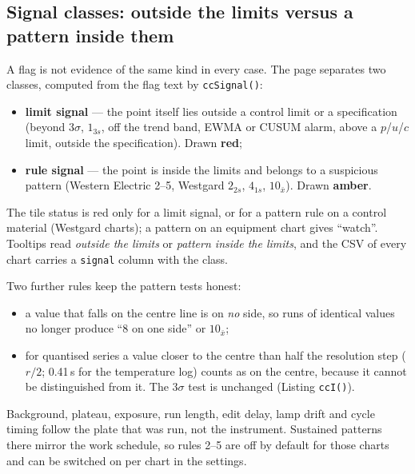 \subsection{Signal classes: outside the limits versus a pattern inside them}\label{sec:signals}
A flag is not evidence of the same kind in every case. The page separates two classes, computed from the flag text by
\texttt{ccSignal()}:
\begin{itemize}
\item \textbf{limit signal} — the point itself lies outside a control limit or a specification (beyond $3\sigma$, $1_{3s}$,
      off the trend band, EWMA or CUSUM alarm, above a $p$/$u$/$c$ limit, outside the specification). Drawn \textbf{red};
\item \textbf{rule signal} — the point is inside the limits and belongs to a suspicious pattern (Western Electric 2--5,
      Westgard $2_{2s}$, $4_{1s}$, $10_{\bar x}$). Drawn \textbf{amber}.
\end{itemize}
The tile status is red only for a limit signal, or for a pattern rule on a control material (Westgard charts); a pattern on an
equipment chart gives ``watch''. Tooltips read \emph{outside the limits} or \emph{pattern inside the limits}, and the CSV of
every chart carries a \texttt{signal} column with the class.



Two further rules keep the pattern tests honest:
\begin{itemize}
\item a value that falls on the centre line is on \emph{no} side, so runs of identical values no longer produce ``8 on one
      side'' or $10_{\bar x}$;
\item for quantised series a value closer to the centre than half the resolution step ($r/2$; 0.41\,s for the temperature log)
      counts as on the centre, because it cannot be distinguished from it. The $3\sigma$ test is unchanged (Listing \texttt{ccI()}).
\end{itemize}

Background, plateau, exposure, run length, edit delay, lamp drift and cycle timing follow the plate that was run, not the
instrument. Sustained patterns there mirror the work schedule, so rules 2--5 are off by default for those charts and can be
switched on per chart in the settings.



